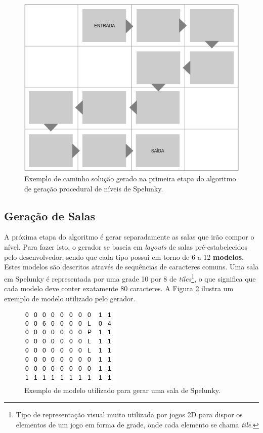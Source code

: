 \begin{figure}[htb!]
\centering
\includegraphics[width=.65\textwidth]{fig/spelunky-procgen-path.png}
\caption{\label{fig:spelunky-procgen-path}Exemplo de caminho solução gerado na
primeira etapa do algoritmo de geração procedural de níveis de Spelunky.}
\end{figure}

\subsection{\label{section:spelunky-procgen-rooms}Geração de Salas}
A próxima etapa do algoritmo é gerar separadamente as salas que irão compor o
nível. Para fazer isto, o gerador se baseia em \textit{layouts} de salas
pré-estabelecidos pelo desenvolvedor, sendo que cada tipo possui em torno de 6 a
12 \textbf{modelos}. Estes modelos são descritos através de sequências de
caracteres comuns. Uma sala em Spelunky é representada por uma grade 10 por 8 de
\textit{tiles}\footnote{Tipo de representação visual muito utilizada por jogos
2D para dispor os elementos de um jogo em forma de grade, onde cada elemento se
chama \textit{tile}.}, o que significa que cada modelo deve conter exatamente 80
caracteres. A Figura \ref{fig:spelunky-procgen-room-template} ilustra um exemplo
de modelo utilizado pelo gerador.

\begin{figure}[htb!]
\centering
\includegraphics[width=.35\textwidth]{fig/spelunky-procgen-room-template.png}
\caption{\label{fig:spelunky-procgen-room-template}Exemplo de modelo utilizado
para gerar uma sala de Spelunky.}
\end{figure}

